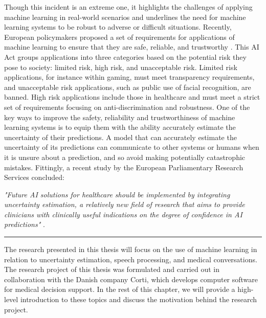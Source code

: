 Though this incident is an extreme one, it highlights the challenges of applying machine learning in real-world scenarios and underlines the need for machine learning systems to be robust to adverse or difficult situations.
Recently, European policymakers proposed a set of requirements for applications of machine learning to ensure that they are safe, reliable, and trustworthy \cite{europeancommission_briefing_2021}. This AI Act groups applications into three categories based on the potential risk they pose to society: limited risk, high risk, and unacceptable risk. Limited risk applications, for instance within gaming, must meet transparency requirements, and unacceptable risk applications, such as public use of facial recognition, are banned. High risk applications include those in healthcare and must meet a strict set of requirements focusing on anti-discrimination and robustness. 
%
One of the key ways to improve the safety, reliability and trustworthiness of machine learning systems is to equip them with the ability accurately estimate the uncertainty of their predictions. 
A model that can accurately estimate the uncertainty of its predictions can communicate to other systems or humans when it is unsure about a prediction, and so avoid making potentially catastrophic mistakes.
Fittingly, a recent study by the European Parliamentary Research Services concluded: 

\begin{center}

\textit{"Future AI solutions for healthcare should be implemented by integrating uncertainty estimation, a relatively new field of research that aims to provide clinicians with clinically useful indications on the degree of confidence in AI predictions"} \cite{europeanparliament_artificial_2022}. 

\end{center}


\vspace{1em}
\begin{center}
\noindent\rule{0.2\textwidth}{0.5pt}
\end{center}
\vspace{1em}

\noindent The research presented in this thesis will focus on the use of machine learning in relation to uncertainty estimation, speech processing, and medical conversations. 
The research project of this thesis was formulated and carried out in collaboration with the Danish company Corti, which develops computer software for medical decision support. 
In the rest of this chapter, we will provide a high-level introduction to these topics and discuss the motivation behind the research project.


